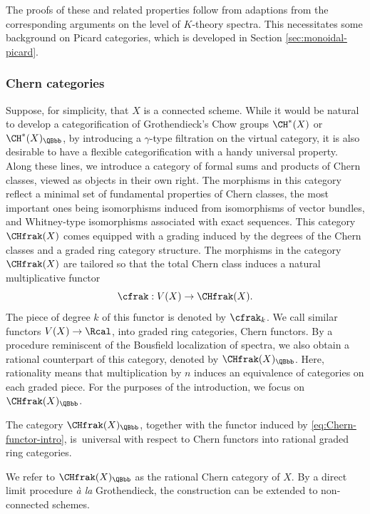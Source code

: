 The proofs of these and related properties follow from adaptions from the corresponding arguments on the level of $K$-theory spectra. This necessitates some background on Picard categories, which is developed in Section \ref{sec:monoidal-picard}.

\subsubsection*{Chern categories} Suppose, for simplicity, that $X$ is a connected scheme. While it would be natural to develop a categorification of Grothendieck's Chow groups $\CH^{\ast}(X)$ or $\CH^{\ast}(X)_\QBbb$, by introducing a $\gamma$-type filtration on the virtual category, it is also desirable to have a flexible categorification with a handy universal property. Along these lines, we introduce a category of formal sums and products of Chern classes, viewed as objects in their own right. The morphisms in this category reflect a minimal set of fundamental properties of Chern classes, the most important ones being isomorphisms induced from isomorphisms of vector bundles, and Whitney-type isomorphisms associated with exact sequences. This category $\CHfrak(X)$ comes equipped with a grading induced by the degrees of the Chern classes and a graded ring category structure. The morphisms in the category $\CHfrak(X)$ are tailored so that the total Chern class induces a natural multiplicative functor
\begin{equation}\label{eq:Chern-functor-intro}
\cfrak: V(X) \to \CHfrak(X).
\end{equation}
The piece of degree $k$ of this functor is denoted by $\cfrak_{k}$. We call similar functors \hbox{$ V(X) \to \Rcal$}, into graded ring categories, Chern functors. By a procedure \hbox{reminiscent} of the Bousfield localization of spectra, we also obtain a rational counterpart of this category, denoted by $\CHfrak(X)_{\QBbb}$. Here, rationality means that multiplication by $n$ induces an equivalence of categories on each graded piece. For the purposes of the introduction, we focus on $\CHfrak(X)_\QBbb$.

\begin{thm}\label{thm:B}
The category $\CHfrak(X)_\QBbb$, together with the functor induced by \eqref{eq:Chern-functor-intro}, is~universal with respect to Chern functors into rational graded ring categories.

\end{thm}
We refer to $\CHfrak(X)_\QBbb$ as the rational Chern category of $X$. By a direct limit procedure \emph{à la} Grothendieck, the construction can be extended to non-connected schemes.

